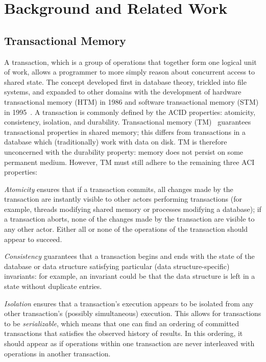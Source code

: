 \chapter{Background and Related Work}
\label{related_work}

\section{Transactional Memory}
A transaction, which is a group of operations that together form one logical unit of work, allows a programmer to more simply reason about concurrent access to shared state. The concept developed first in database theory, trickled into file systems, and expanded to other domains with the development of hardware transactional memory (HTM) in 1986 and software transactional memory (STM) in 1995~\cite{harristm}. 
A transaction is commonly defined by the ACID properties: atomicity, consistency, isolation, and durability. Transactional memory (TM)~\cite{harristm, herlihytm} guarantees transactional properties in shared memory; this differs from transactions in a database which (traditionally) work with data on disk.
TM is therefore unconcerned with the durability property: memory does not persist on some permanent medium. However, TM must still adhere to the remaining three ACI properties:

\emph{Atomicity} ensures that if a transaction commits, all changes made by the transaction are instantly visible to other actors performing transactions (for example, threads modifying shared memory or processes modifying a database); if a transaction aborts, none of the changes made by the transaction are visible to any other actor. Either all or none of the operations of the transaction should appear to succeed.

\emph{Consistency} guarantees that a transaction begins and ends with the state of the database or data structure satisfying particular (data structure-specific) invariants: for example, an invariant could be that the data structure is left in a state without duplicate entries.

\emph{Isolation} ensures that a transaction's execution appears to be isolated from any other transaction's (possibly simultaneous) execution. This allows for transactions to be \emph{serializable}, which means that one can find an ordering of committed transactions that satisfies the observed history of results. In this ordering, it should appear as if operations within one transaction are never interleaved with operations in another transaction. 

